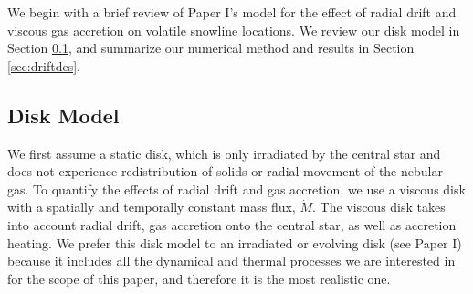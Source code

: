 \documentclass[apj]{emulateapj}
\begin{document}
We begin with a brief review of Paper I's model for the effect of radial drift and viscous gas accretion on volatile snowline locations. We review our disk model in Section \ref{sec:disktime}, and summarize our numerical method and results in Section \ref{sec:driftdes}.

\subsection{Disk Model}
\label{sec:disktime}

We first assume a static disk, which is only irradiated by the central star and does not experience redistribution of solids or radial movement of the nebular gas. To quantify the effects of radial drift and gas accretion, we use a viscous disk with a spatially and temporally constant mass flux, $\dot{M}$. The viscous disk takes into account radial drift, gas accretion onto the central star, as well as accretion heating. We prefer this disk model to an irradiated or evolving disk (see Paper I) because it includes all the dynamical and thermal processes we are interested in for the scope of this paper, and therefore it is the most realistic one.  
\end{document}
